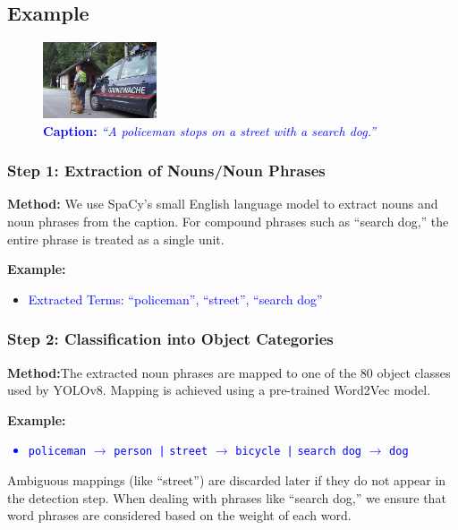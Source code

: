\documentclass[11pt,letterpaper]{article}
\begin{document}
\subsection*{Example}
\noindent
   \begin{figure}[h]
    \centering
    \includegraphics[width=0.3\textwidth]{midterm_report/assets/oriIMG.jpg}
    \caption{\textcolor{blue}{\textbf{Caption:} \emph{``A policeman stops on a street with a search dog.''}}}
    \label{fig:original_image}
\end{figure}
\subsubsection*{Step 1: Extraction of Nouns/Noun Phrases}

\textbf{Method:} We use SpaCy's small English language model to extract nouns and noun phrases from the caption. For compound phrases such as ``search dog,'' the entire phrase is treated as a single unit.

\noindent
\textbf{Example:}
\begin{itemize}
  \item \textcolor{blue}{ Extracted Terms: ``policeman'', ``street'', ``search dog''}
\end{itemize}


\subsubsection*{Step 2: Classification into Object Categories}

\textbf{Method:}The extracted noun phrases are mapped to one of the 80 object classes used by YOLOv8. Mapping is achieved using a pre-trained Word2Vec model.


\noindent
\textbf{Example:}
\textcolor{blue}{\begin{itemize}
  \item \texttt{policeman} $\to$ \texttt{person |}
  \texttt{street} $\to$ \texttt{bicycle |}
  \texttt{search dog} $\to$ \texttt{dog}
\end{itemize}}

\noindent
Ambiguous mappings (like ``street'') are discarded later if they do not appear in the detection step. When dealing with phrases like ``search dog,'' we ensure that word phrases are considered based on the weight of each word.
\end{document}
